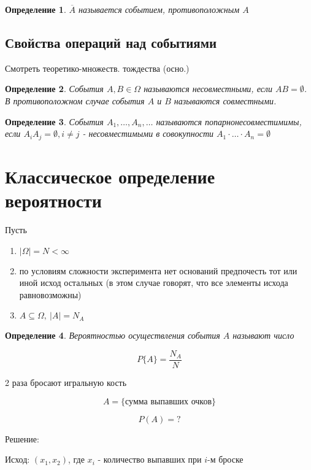 \documentclass[a4paper, 14pt]{report}
\newtheorem{defenition}{Определение}[chapter]
\begin{document}
\begin{defenition}
    $\overline{A}$ называется событием, противоположным $A$
\end{defenition}

\subsection{Свойства операций над событиями}

Смотреть теоретико-множеств. тождества (осно.)

\begin{defenition}
    События $A,B \in \Omega$ называются несовместными, если $AB = \emptyset$. В противоположном случае события $A$ и $B$ называются совместными.
\end{defenition}

\begin{defenition}
    События $A_1, \dots, A_n, \dots$ называются попарнонесовместимимы, если $A_i A_j = \emptyset, i \ne j$ - несовместимыми в совокупности $A_1 \cdot \dots \cdot A_n = \emptyset$
\end{defenition}

\section{Классическое определение вероятности}

Пусть

\begin{enumerate}
    \item $|\Omega| = N < \infty$
    \item по условиям сложности эксперимента нет оснований предпочесть тот или иной исход остальных (в этом случае говорят, что все элементы исхода равновозможны)
    \item $A \subseteq \Omega,\ |A| = N_A$
\end{enumerate}

\begin{defenition}
    Вероятностью осуществления события $A$ называют число

    $$
    P\{A\} = \frac{N_A}{N}
    $$
\end{defenition}

2 раза бросают игральную кость

$$
A = \{ \text{сумма выпавших очков} \}
$$

$$
P(A) = ?
$$

Решение:

Исход: $(x_1, x_2)$, где $x_i$ - количество выпавших при $i$-м броске
\end{document}
